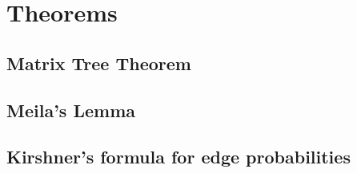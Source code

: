 \documentclass[11pt,a4paper]{article}
\begin{document}
\section{Theorems}
\subsection{Matrix Tree Theorem}
\subsection{Meila's Lemma}
\subsection{Kirshner's formula for edge probabilities}
\end{document}

